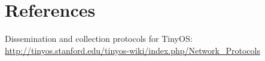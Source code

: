 \documentclass[a4paper]{article}
\begin{document}
\section{References}
Dissemination and collection protocols for TinyOS: \url{http://tinyos.stanford.edu/tinyos-wiki/index.php/Network_Protocols}


%

%
\end{document}
